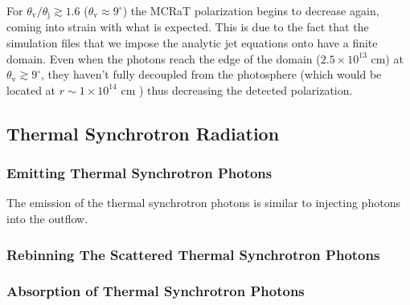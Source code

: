 \documentclass[12pt,a4paper]{article}
\begin{document}
For $\theta_{\mathrm{v}}/\theta_{\mathrm{j}} \gtrsim 1.6$ ($\theta_{\mathrm{v}} \approx 9^\circ$) the MCRaT polarization begins to decrease again, coming into strain with what is expected. This is due to the fact that the simulation files that we impose the analytic jet equations onto have a finite domain. Even when the photons reach the edge of the domain ($2.5 \times 10^{13}$ cm) at $\theta_{\mathrm{v}} \gtrsim 9^\circ$, they haven't fully decoupled from the photosphere (which would be located at $r\sim 1\times 10^{14}$ cm \citep{lundman2014polarization}) thus decreasing the detected polarization. 

\subsection{Thermal Synchrotron Radiation}\label{synch}
\subsubsection{Emitting Thermal Synchrotron Photons}
The emission of the thermal synchrotron photons is similar to injecting photons into the outflow.

\subsubsection{Rebinning The Scattered Thermal Synchrotron Photons}

\subsubsection{Absorption of Thermal Synchrotron Photons}



\end{document}
